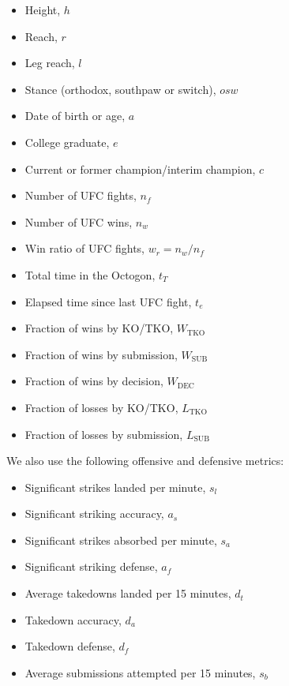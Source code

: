 \begin{itemize}[noitemsep]
  \item Height, $h$
  \item Reach, $r$
  \item Leg reach, $l$
  \item Stance (orthodox, southpaw or switch), $osw$
  \item Date of birth or age, $a$
  \item College graduate, $e$
  \item Current or former champion/interim champion, $c$
  \item Number of UFC fights, $n_f$
  \item Number of UFC wins, $n_w$
  \item Win ratio of UFC fights, $w_r=n_w/n_f$
  \item Total time in the Octogon, $t_T$
  \item Elapsed time since last UFC fight, $t_e$
  \item Fraction of wins by KO/TKO, $W_{\textrm{TKO}}$
  \item Fraction of wins by submission, $W_{\textrm{SUB}}$
  \item Fraction of wins by decision, $W_{\textrm{DEC}}$
  \item Fraction of losses by KO/TKO, $L_{\textrm{TKO}}$
  \item Fraction of losses by submission, $L_{\textrm{SUB}}$
\end{itemize}

\noindent
We also use the following offensive and defensive metrics:

\begin{itemize}[noitemsep]
  \item Significant strikes landed per minute, $s_l$
  \item Significant striking accuracy, $a_s$
  \item Significant strikes absorbed per minute, $s_a$
  \item Significant striking defense, $a_f$
  \item Average takedowns landed per 15 minutes, $d_t$
  \item Takedown accuracy, $d_a$
  \item Takedown defense, $d_f$
  \item Average submissions attempted per 15 minutes, $s_b$
\end{itemize}


